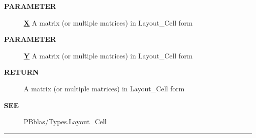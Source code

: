 \par
\begin{description}
\item [\colorbox{tagtype}{\color{white} \textbf{\textsf{PARAMETER}}}] \textbf{\underline{X}} A matrix (or multiple matrices) in Layout\_Cell form
\item [\colorbox{tagtype}{\color{white} \textbf{\textsf{PARAMETER}}}] \textbf{\underline{Y}} A matrix (or multiple matrices) in Layout\_Cell form
\item [\colorbox{tagtype}{\color{white} \textbf{\textsf{RETURN}}}] \textbf{\underline{}} A matrix (or multiple matrices) in Layout\_Cell form
\item [\colorbox{tagtype}{\color{white} \textbf{\textsf{SEE}}}] \textbf{\underline{}} PBblas/Types.Layout\_Cell
\end{description}

\rule{\linewidth}{0.5pt}
